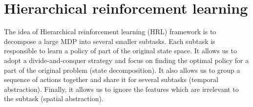 
\section{Hierarchical reinforcement learning}
\label{se:HRL}
The idea of Hierarchical reinforcement learning (HRL) framework is to decompose
a large MDP into several smaller subtasks. Each subtask is responsible to
learn a policy of part of the original state space.
It allows us to adopt a divide-and-conquer
strategy and focus on finding the optimal policy for a part of
the original problem (state decomposition).
It also allows us to group a sequence of actions together and share
it for several subtasks (temporal abstraction). Finally, it allows us to ignore the features which
are irrelevant to the subtask (spatial abstraction).


